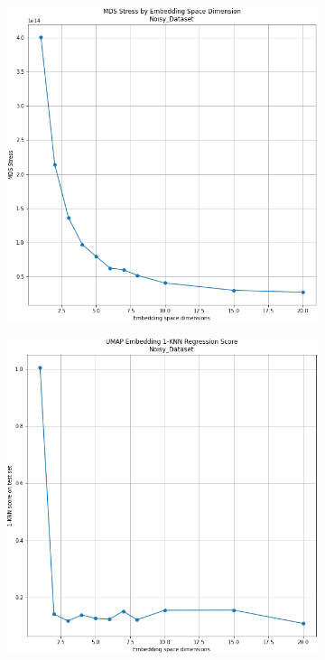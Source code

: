 \documentclass[11pt, a4paper, twoside]{article} %
\begin{document}
\begin{figure}[h!] 
     \centering 
    \begin{subfigure}[b]{0.325\linewidth}
    \includegraphics[width=\linewidth]{dim1.png}
     \end{subfigure}
 \begin{subfigure}[b]{0.325\linewidth}
     \includegraphics[width=\linewidth]{dim3.png}

\end{subfigure}
\end{figure}
\end{document}
